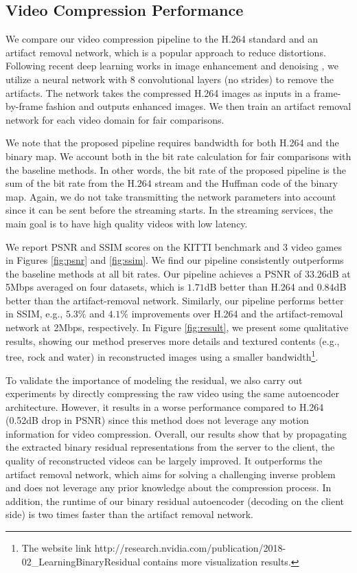 \documentclass[letterpaper]{article} %
\begin{document}
	\subsection{Video Compression Performance}
	
	We compare our video compression pipeline to the H.264 standard and an artifact removal network, which is a popular approach to reduce distortions. Following recent deep learning works in image enhancement and denoising \cite{Kim_CVPR_2016,Zhang_TIP_2017}, we utilize a neural network with 8 convolutional layers (no strides) to remove the artifacts. The network takes the compressed H.264 images as inputs in a frame-by-frame fashion and outputs enhanced images. We then train an artifact removal network for each video domain for fair comparisons.
	
	We note that the proposed pipeline requires bandwidth for both H.264 and the binary map. We account both in the bit rate calculation for fair comparisons with the baseline methods. In other words, the bit rate of the proposed pipeline is the sum of the bit rate from the H.264 stream and the Huffman code of the binary map. Again, we do not take transmitting the network parameters into account since it can be sent before the streaming starts. In the streaming services, the main goal is to have high quality videos with low latency.
	
	We report PSNR and SSIM scores on the KITTI benchmark and 3 video games in Figures \ref{fig:psnr} and \ref{fig:ssim}. We find our pipeline consistently outperforms the baseline methods at all bit rates. Our pipeline achieves a PSNR of $33.26$dB at 5Mbps averaged on four datasets, which is $1.71$dB better than H.264 and $0.84$dB better than the artifact-removal network. Similarly, our pipeline performs better in SSIM, e.g., $5.3\%$ and $4.1\%$ improvements over H.264 and the artifact-removal network at 2Mbps, respectively. In Figure \ref{fig:result}, we present some qualitative results, showing our method preserves more details and textured contents (e.g., tree, rock and water) in reconstructed images using a smaller bandwidth\footnote{The website link http://research.nvidia.com/publication/2018-02\_Learning\-Binary\-Residual contains more visualization results.}. 
	
	
	To validate the importance of modeling the residual, we also carry out experiments by directly compressing the raw video using the same autoencoder architecture. However, it results in a worse performance compared to H.264 (0.52dB drop in PSNR) since this method does not leverage any motion information for video compression. 	Overall, our results show that by propagating the extracted binary residual representations from the server to the client, the quality of reconstructed videos can be largely improved. It outperforms the artifact removal network, which aims for solving a challenging inverse problem and does not leverage any prior knowledge about the compression process. In addition, the runtime of our binary residual autoencoder (decoding on the client side) is two times faster than the artifact removal network.
	
\end{document}
